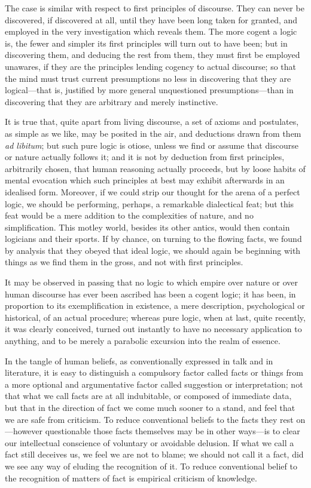 The case is similar with respect to first principles of discourse.
They can never be discovered, if discovered at all, until they have
been long taken for granted, and employed in the very investigation
which reveals them. The more cogent a logic is, the fewer and simpler
its first principles will turn out to have been; but in discovering
them, and deducing the rest from them, they must first be employed
unawares, if they are the principles lending cogency to actual
discourse; so that the mind must trust current presumptions no less in
discovering that they are logical---that is, justified by more general
unquestioned presumptions---than in discovering that they are
arbitrary and merely instinctive.

It is true that, quite apart from living discourse, a set of axioms
and postulates, as simple as we like, may be posited in the air, and
deductions drawn from them \textit{ad libitum}; but such pure logic is
otiose, unless we find or assume that discourse or nature actually
follows it; and it is not by deduction from first principles,
arbitrarily chosen, that human reasoning actually proceeds, but by
loose habits of mental evocation which such principles at best may
exhibit afterwards in an idealised form. Moreover, if we could strip
our  thought for the arena of a perfect logic, we should be
performing, perhaps, a remarkable dialectical feat; but this feat
would be a mere addition to the complexities of nature, and no
simplification. This motley world, besides its other antics, would
then contain logicians and their sports. If by chance, on turning to
the flowing facts, we found by analysis that they obeyed that ideal
logic, we should again be beginning with things as we find them in the
gross, and not with first principles.

It may be observed in passing that no logic to which empire over
nature or over human discourse has ever been ascribed has been a
cogent logic; it has been, in proportion to its exemplification in
existence, a mere description, psychological or historical, of an
actual procedure; whereas pure logic, when at last, quite recently, it
was clearly conceived, turned out instantly to have no necessary
application to anything, and to be merely a parabolic excursion into
the realm of essence.

In the tangle of human beliefs, as conventionally expressed in talk
and in literature, it is easy to distinguish a compulsory factor
called facts or things from a more optional and argumentative factor
called suggestion or interpretation; not that what we call facts are
at all indubitable, or composed of immediate data, but that in the
direction of fact we come much sooner to a stand, and feel that we are
safe from criticism. To reduce conventional beliefs to the facts they
rest on---however questionable those facts themselves may be in other
ways---is to clear our intellectual conscience of voluntary or
avoidable delusion. If what we call a fact still deceives us, we feel
we are not to blame; we should not call it a fact, did we see any way
of eluding the recognition of it. To reduce conventional belief to the
recognition of matters of fact is empirical criticism of knowledge.

